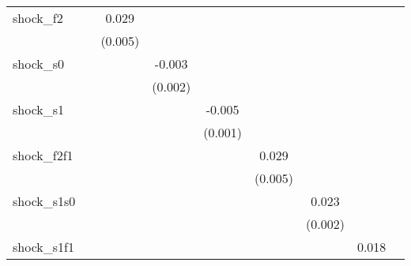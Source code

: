 {\begin{tabular}{l*{8}{c}}
\addlinespace
shock\_f2    &                     &       0.029\sym{***}&                     &                     &                     &                     &                     &                     \\
            &                     &     (0.005)         &                     &                     &                     &                     &                     &                     \\
\addlinespace
shock\_s0    &                     &                     &      -0.003         &                     &                     &                     &                     &                     \\
            &                     &                     &     (0.002)         &                     &                     &                     &                     &                     \\
\addlinespace
shock\_s1    &                     &                     &                     &      -0.005\sym{***}&                     &                     &                     &                     \\
            &                     &                     &                     &     (0.001)         &                     &                     &                     &                     \\
\addlinespace
shock\_f2f1  &                     &                     &                     &                     &       0.029\sym{***}&                     &                     &                     \\
            &                     &                     &                     &                     &     (0.005)         &                     &                     &                     \\
\addlinespace
shock\_s1s0  &                     &                     &                     &                     &                     &       0.023\sym{***}&                     &                     \\
            &                     &                     &                     &                     &                     &     (0.002)         &                     &                     \\
\addlinespace
shock\_s1f1  &                     &                     &                     &                     &                     &                     &       0.018\sym{***}&                     \\

\end{tabular}}

